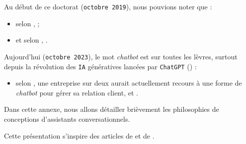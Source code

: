 \label{annex:B-ANNEXE-CHATBOT}
	
	
	Au début de ce doctorat (\texttt{octobre 2019}), nous pouvions noter que :
	\begin{itemize}
		\item selon \cite{costello-lodolce:2019:gartner-top-technologies},  ;
		\item et selon \cite{goasduff:2019:chatbots-will-appeal}, .
	\end{itemize}
	
	Aujourd'hui (\texttt{octobre 2023}), le mot \textit{chatbot} est sur toutes les lèvres, surtout depuis la révolution des \texttt{IA} génératives lancées par \texttt{ChatGPT} (\cite{openai:2023:chatgpt}) :
	\begin{itemize}
		\item selon \cite{costello-lodolce:2022:gartner-predicts-chatbots}, une entreprise sur deux aurait actuellement recours à une forme de \textit{chatbot} pour gérer sa relation client, et .
	\end{itemize}

	Dans cette annexe, nous allons détailler brièvement les philosophies de conceptions d'assistants conversationnels.
	
	\begin{leftBarInformation}
		Cette présentation s'inspire des articles de \cite{chen-etal:2017:survey-dialogue-systems} et de \cite{adamopoulou-moussiades:2020:overview-chatbot-technology}.
	\end{leftBarInformation}
	
	\minitoc
	
	
	
	
